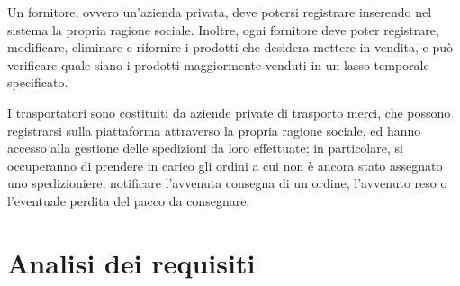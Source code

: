 \documentclass[12pt]{report}
\begin{document}
    Un fornitore, ovvero un'azienda privata, deve potersi registrare inserendo nel sistema la propria ragione sociale. Inoltre, ogni fornitore deve poter registrare, modificare, eliminare e rifornire i prodotti che desidera mettere in vendita, e può verificare quale siano i prodotti maggiormente venduti in un lasso temporale specificato.

    I trasportatori sono costituiti da aziende private di trasporto merci, che possono registrarsi sulla piattaforma attraverso la propria ragione sociale, ed hanno accesso alla gestione delle spedizioni da loro effettuate; in particolare, si occuperanno di prendere in carico gli ordini a cui non è ancora stato assegnato uno spedizioniere, notificare l'avvenuta consegna di un ordine, l'avvenuto reso o l'eventuale perdita del pacco da consegnare.

    \section{Analisi dei requisiti}
\end{document}
